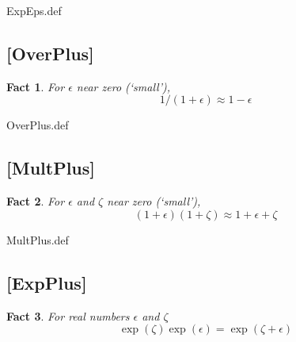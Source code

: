 \message{ !name(MathFactsList.tex)}\documentclass{handout}
\newtheorem{Fact}{Fact}
\begin{document}
\begin{verbatimwrite}{ExpEps.def}
\providecommand{\ExpEps}{\href{https://www.econ2.jhu.edu/people/ccarroll/public/LectureNotes/MathFacts/MathFactsList\#ExpEps}{\ensuremath{\mathtt{[ExpEps]}}}}
\end{verbatimwrite}


\hypertarget{OverPlus}{}
\subsection{[OverPlus]}
\begin{Fact} For $\epsilon$ near zero (`small'), 
\begin{equation}
1/(1+\epsilon) \approx 1-\epsilon
\end{equation}
\end{Fact}

\begin{verbatimwrite}{OverPlus.def}
\providecommand{\OverPlus}{\href{https://www.econ2.jhu.edu/people/ccarroll/public/LectureNotes/MathFacts/MathFactsList\#OverPlus}{\ensuremath{\mathtt{[OverPlus]}}}}
\end{verbatimwrite}


\hypertarget{MultPlus}{}
\subsection{[MultPlus]}
\begin{Fact} For $\epsilon$ and $\zeta$ near zero (`small'), 
\begin{equation}
(1+\epsilon)(1+\zeta) \approx 1+\epsilon+\zeta
\end{equation}
\end{Fact}

\begin{verbatimwrite}{MultPlus.def}
\providecommand{\MultPlus}{\href{https://www.econ2.jhu.edu/people/ccarroll/public/LectureNotes/MathFacts/MathFactsList\#MultPlus}{\ensuremath{\mathtt{[MultPlus]}}}}
\end{verbatimwrite}

\hypertarget{ExpPlus}{}
\subsection{[ExpPlus]}
\begin{Fact} For real numbers $\epsilon$ and $\zeta$ 
\begin{equation}
\exp(\zeta)\exp(\epsilon) = \exp(\zeta+\epsilon)
\end{equation}
\end{Fact}
\end{document}
